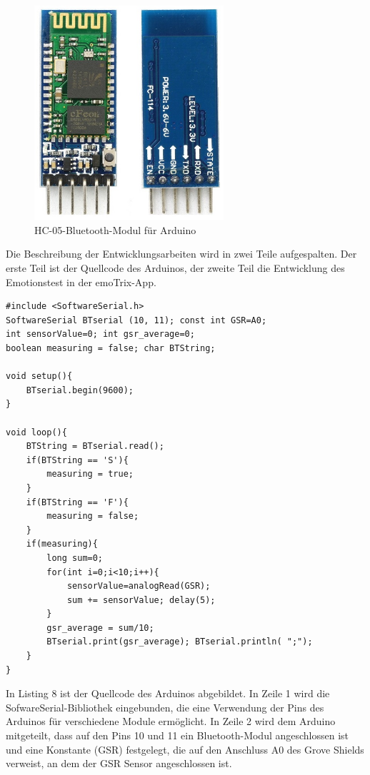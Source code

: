 \begin{figure}[h]
	\centering
	\includegraphics[width=7cm]{Bilder/hc05.jpg}
	\caption[HC-05-Bluetooth-Modul für Arduino]{HC-05-Bluetooth-Modul für Arduino\footnotemark}
\end{figure}%
\newline \newline
Die Beschreibung der Entwicklungsarbeiten wird in zwei Teile aufgespalten. Der erste Teil ist der Quellcode des Arduinos, der zweite Teil die Entwicklung des Emotionstest in der emoTrix-App. \newline
\begin{lstlisting}[caption={Quellcode des Arduinos},style=Arduino]
#include <SoftwareSerial.h>
SoftwareSerial BTserial (10, 11); const int GSR=A0;
int sensorValue=0; int gsr_average=0;
boolean measuring = false; char BTString;

void setup(){
	BTserial.begin(9600);
}

void loop(){
	BTString = BTserial.read();
	if(BTString == 'S'){
		measuring = true;
	}
	if(BTString == 'F'){
		measuring = false;
	}
	if(measuring){
		long sum=0;
		for(int i=0;i<10;i++){ 
			sensorValue=analogRead(GSR);
			sum += sensorValue; delay(5);
		}
		gsr_average = sum/10;
		BTserial.print(gsr_average); BTserial.println( ";");
	}
}
\end{lstlisting}
In Listing 8 ist der Quellcode des Arduinos abgebildet. In Zeile 1 wird die SofwareSerial-Bibliothek eingebunden, die eine Verwendung der Pins des Arduinos für verschiedene Module ermöglicht. In Zeile 2 wird dem Arduino mitgeteilt, dass auf den Pins 10 und 11 ein Bluetooth-Modul angeschlossen ist und eine Konstante (GSR) festgelegt, die auf den Anschluss A0 des Grove Shields verweist, an dem der GSR Sensor angeschlossen ist. \newline
